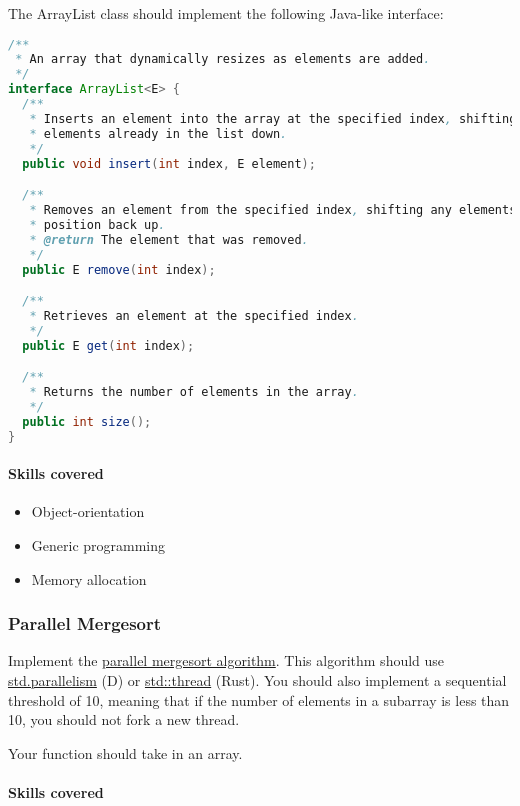 The ArrayList class should implement the following Java-like interface:

\begin{lstlisting}[language=Java]
/**
 * An array that dynamically resizes as elements are added.
 */
interface ArrayList<E> {
  /**
   * Inserts an element into the array at the specified index, shifting any
   * elements already in the list down.
   */
  public void insert(int index, E element);

  /**
   * Removes an element from the specified index, shifting any elements past its
   * position back up.
   * @return The element that was removed.
   */
  public E remove(int index);

  /**
   * Retrieves an element at the specified index.
   */
  public E get(int index);

  /**
   * Returns the number of elements in the array.
   */
  public int size();
}
\end{lstlisting}

\paragraph{Skills covered}\label{skills-covered-2}

\begin{itemize}
\itemsep1pt\parskip0pt
\item
  Object-orientation
\item
  Generic programming
\item
  Memory allocation
\end{itemize}

\subsubsection{Parallel Mergesort}\label{parallel-mergesort}

Implement the
\href{http://en.wikipedia.org/wiki/Merge_sort\#Parallel_merge_sort}{parallel
mergesort algorithm}. This algorithm should use
\href{http://dlang.org/phobos/std_parallelism.html}{std.parallelism} (D)
or \href{http://doc.rust-lang.org/std/thread/}{std::thread} (Rust). You
should also implement a sequential threshold of 10, meaning that if the
number of elements in a subarray is less than 10, you should not fork a
new thread.

Your function should take in an array.

\paragraph{Skills covered}\label{skills-covered-3}

